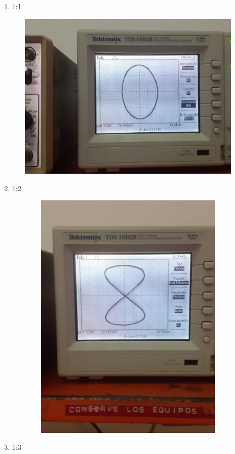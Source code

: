 \documentclass[12pt]{article}
\begin{document}
	\begin{enumerate}
		\item 1:1
		
		\begin{center}
			\includegraphics[width=12cm,height=8cm]{Img/l1}
		\end{center}
	
		\item 1:2
		
		\begin{center}
			\includegraphics[width=12cm,height=12cm]{Img/l2}
		\end{center}
	
		\item 1:3
		

\end{enumerate}
\end{document}
